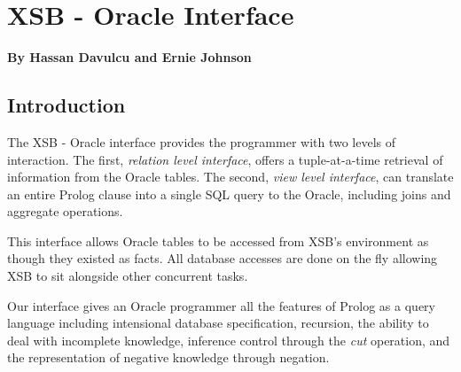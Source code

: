 \chapter{XSB - Oracle Interface} \label{oracle_inter}

\begin{center}
{\Large {\bf By Hassan Davulcu and Ernie Johnson }}
\end{center}

\section{Introduction}

The XSB - Oracle interface provides the programmer with two levels of
interaction.  The first, {\it relation level interface},
offers a tuple-at-a-time retrieval of information from the Oracle
tables.  The second, {\it view level interface}, can translate an
entire Prolog clause into a single SQL query to the Oracle, including
joins and aggregate operations.

This interface allows Oracle tables to be accessed from XSB's
environment as though they existed as facts. All database accesses are
done on the fly allowing XSB to sit alongside other concurrent tasks.

Our interface gives an Oracle programmer all the features of Prolog as
a query language including intensional database specification,
recursion, the ability to deal with incomplete knowledge, inference
control through the {\it cut} operation, and the representation of
negative knowledge through negation.


